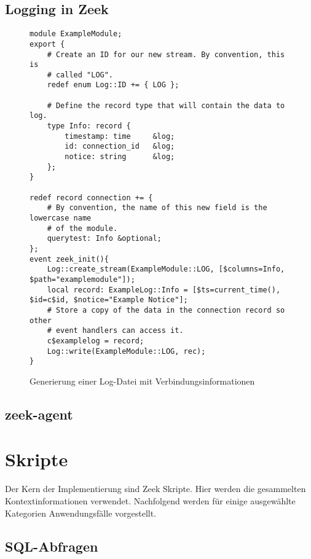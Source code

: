 \subsection{Logging in Zeek}
\begin{figure}[H]
\centering
\begin{lstlisting}
module ExampleModule;
export {
    # Create an ID for our new stream. By convention, this is
    # called "LOG".
    redef enum Log::ID += { LOG };

    # Define the record type that will contain the data to log.
    type Info: record {
        timestamp: time		&log;
        id: connection_id	&log; 
        notice: string		&log;
    };
}

redef record connection += {
    # By convention, the name of this new field is the lowercase name
    # of the module.
    querytest: Info &optional;
};
event zeek_init(){
	Log::create_stream(ExampleModule::LOG, [$columns=Info, $path="examplemodule"]);
	local record: ExampleLog::Info = [$ts=current_time(), $id=c$id, $notice="Example Notice"];
    # Store a copy of the data in the connection record so other
    # event handlers can access it.
    c$examplelog = record;
    Log::write(ExampleModule::LOG, rec);
}
\end{lstlisting}
\caption{Generierung einer Log-Datei mit Verbindungsinformationen}
\end{figure}
\subsection{zeek-agent}
\newpage
\section{Skripte}
Der Kern der Implementierung sind Zeek Skripte. Hier werden die gesammelten Kontextinformationen verwendet. Nachfolgend werden für einige ausgewählte Kategorien Anwendungsfälle vorgestellt.

\subsection{SQL-Abfragen}
